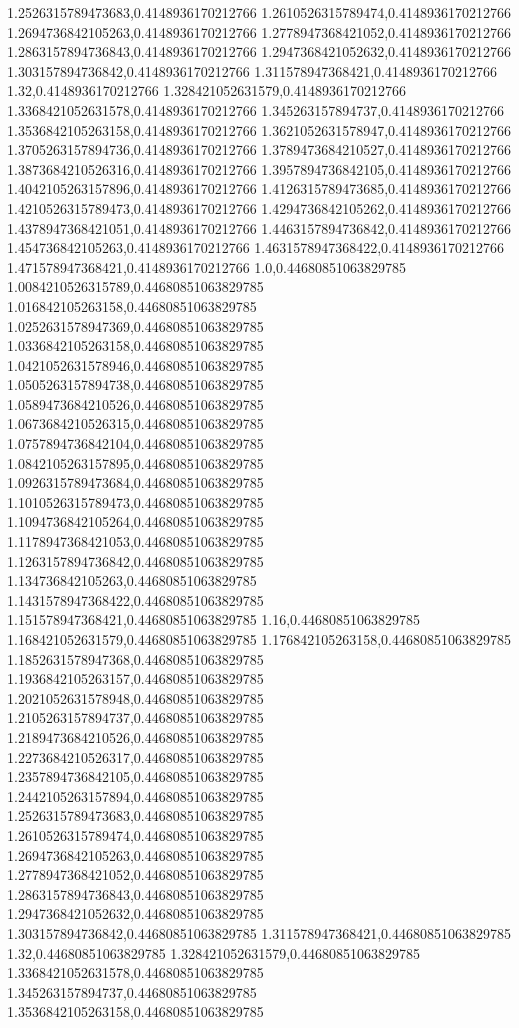 1.2526315789473683,0.4148936170212766
1.2610526315789474,0.4148936170212766
1.2694736842105263,0.4148936170212766
1.2778947368421052,0.4148936170212766
1.2863157894736843,0.4148936170212766
1.2947368421052632,0.4148936170212766
1.303157894736842,0.4148936170212766
1.311578947368421,0.4148936170212766
1.32,0.4148936170212766
1.328421052631579,0.4148936170212766
1.3368421052631578,0.4148936170212766
1.345263157894737,0.4148936170212766
1.3536842105263158,0.4148936170212766
1.3621052631578947,0.4148936170212766
1.3705263157894736,0.4148936170212766
1.3789473684210527,0.4148936170212766
1.3873684210526316,0.4148936170212766
1.3957894736842105,0.4148936170212766
1.4042105263157896,0.4148936170212766
1.4126315789473685,0.4148936170212766
1.4210526315789473,0.4148936170212766
1.4294736842105262,0.4148936170212766
1.4378947368421051,0.4148936170212766
1.4463157894736842,0.4148936170212766
1.454736842105263,0.4148936170212766
1.4631578947368422,0.4148936170212766
1.471578947368421,0.4148936170212766
1.0,0.44680851063829785
1.0084210526315789,0.44680851063829785
1.016842105263158,0.44680851063829785
1.0252631578947369,0.44680851063829785
1.0336842105263158,0.44680851063829785
1.0421052631578946,0.44680851063829785
1.0505263157894738,0.44680851063829785
1.0589473684210526,0.44680851063829785
1.0673684210526315,0.44680851063829785
1.0757894736842104,0.44680851063829785
1.0842105263157895,0.44680851063829785
1.0926315789473684,0.44680851063829785
1.1010526315789473,0.44680851063829785
1.1094736842105264,0.44680851063829785
1.1178947368421053,0.44680851063829785
1.1263157894736842,0.44680851063829785
1.134736842105263,0.44680851063829785
1.1431578947368422,0.44680851063829785
1.151578947368421,0.44680851063829785
1.16,0.44680851063829785
1.168421052631579,0.44680851063829785
1.176842105263158,0.44680851063829785
1.1852631578947368,0.44680851063829785
1.1936842105263157,0.44680851063829785
1.2021052631578948,0.44680851063829785
1.2105263157894737,0.44680851063829785
1.2189473684210526,0.44680851063829785
1.2273684210526317,0.44680851063829785
1.2357894736842105,0.44680851063829785
1.2442105263157894,0.44680851063829785
1.2526315789473683,0.44680851063829785
1.2610526315789474,0.44680851063829785
1.2694736842105263,0.44680851063829785
1.2778947368421052,0.44680851063829785
1.2863157894736843,0.44680851063829785
1.2947368421052632,0.44680851063829785
1.303157894736842,0.44680851063829785
1.311578947368421,0.44680851063829785
1.32,0.44680851063829785
1.328421052631579,0.44680851063829785
1.3368421052631578,0.44680851063829785
1.345263157894737,0.44680851063829785
1.3536842105263158,0.44680851063829785
